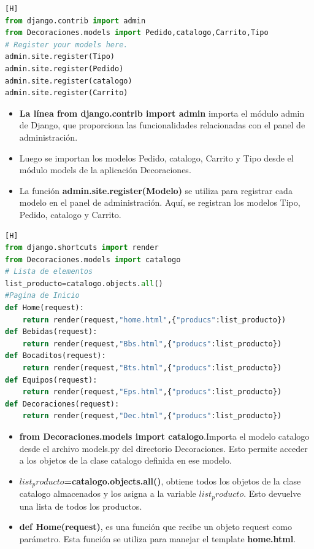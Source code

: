 \documentclass{article}
\begin{document}
\begin{itemize}
\begin{itemize}
	\end{itemize}
     \begin{lstlisting}[language=python,caption={Decoraciones/models.py}][H]
from django.contrib import admin
from Decoraciones.models import Pedido,catalogo,Carrito,Tipo
# Register your models here.
admin.site.register(Tipo)
admin.site.register(Pedido)
admin.site.register(catalogo)
admin.site.register(Carrito)
    \end{lstlisting}
	\begin{itemize}
	    \item\textbf{La línea from django.contrib import admin} importa el módulo admin de Django, que proporciona las funcionalidades relacionadas con el panel de administración.
        \item Luego se importan los modelos Pedido, catalogo, Carrito y Tipo desde el módulo models de la aplicación Decoraciones.
        \item La función \textbf{admin.site.register(Modelo)} se utiliza para registrar cada modelo en el panel de administración. Aquí, se registran los modelos Tipo, Pedido, catalogo y Carrito.
	\end{itemize}
    \begin{lstlisting}[language=python,caption={Decoraciones/views.py}][H]
from django.shortcuts import render
from Decoraciones.models import catalogo
# Lista de elementos
list_producto=catalogo.objects.all()
#Pagina de Inicio
def Home(request):
    return render(request,"home.html",{"producs":list_producto})
def Bebidas(request):
    return render(request,"Bbs.html",{"producs":list_producto})
def Bocaditos(request):
    return render(request,"Bts.html",{"producs":list_producto})
def Equipos(request):
    return render(request,"Eps.html",{"producs":list_producto})
def Decoraciones(request):
    return render(request,"Dec.html",{"producs":list_producto})
    \end{lstlisting}
	\begin{itemize}
	    \item \textbf{from Decoraciones.models import catalogo}.Importa el modelo catalogo desde el archivo models.py del directorio Decoraciones. Esto permite acceder a los objetos de la clase catalogo definida en ese modelo.
        \item \textbf{$list_producto$=catalogo.objects.all()}, obtiene todos los objetos de la clase catalogo almacenados y los asigna a la variable \textbf{$list_producto$}. Esto devuelve una lista de todos los productos.
        \item \textbf{def Home(request)}, es una función que recibe un objeto request como parámetro. Esta función se utiliza para manejar el template \textbf{home.html}.

\end{itemize}
\end{itemize}
\end{document}
